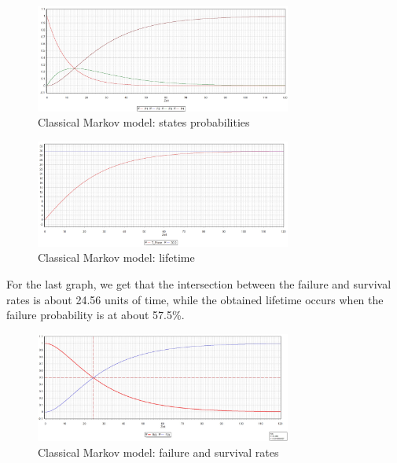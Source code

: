 \documentclass{article}
\begin{document}
\begin{doublespacing}
\begin{figure}[H] 
    \centering
    \includegraphics[width=0.75\textwidth]{Images/StatesIdeal.JPG} 
    \caption{Classical Markov model: states probabilities} 
    \label{fig:HybridStatesC} 
\end{figure}

\begin{figure}[H] 
    \centering
    \includegraphics[width=0.75\textwidth]{Images/TimeLifeIdeal.JPG} 
    \caption{Classical Markov model: lifetime } 
    \label{fig:HybridTimeLifeC} 
\end{figure}


\par For the last graph, we get that the intersection between the failure and survival rates is about 24.56 units of time, while the obtained lifetime occurs when the failure probability is at about 57.5\%.

\begin{figure}[H] 
    \centering
    \includegraphics[width=0.75\textwidth]{Images/FSIdIn.JPG} 
    \caption{Classical Markov model: failure and survival rates} 
    \label{fig:FSCIn} 
\end{figure}


\end{doublespacing}
\end{document}
